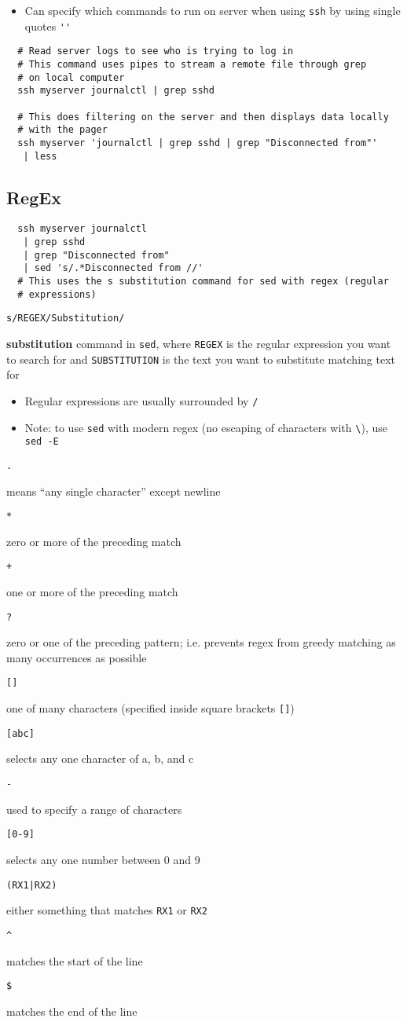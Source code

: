 \documentclass[letterpaper,12pt]{article}
\newcommand*{\lstitem}[1]{
  \setbox0\hbox{\lstinline{#1}}
  \item[\usebox0]
}
\begin{document}
\begin{itemize}
 \item Can specify which commands to run on server when using \lstinline{ssh} by using single quotes \lstinline{''}
\end{itemize}

\begin{lstlisting}
  # Read server logs to see who is trying to log in
  # This command uses pipes to stream a remote file through grep
  # on local computer
  ssh myserver journalctl | grep sshd

  # This does filtering on the server and then displays data locally
  # with the pager
  ssh myserver 'journalctl | grep sshd | grep "Disconnected from"'
   | less
\end{lstlisting}

\subsection{RegEx}

\begin{lstlisting}
  ssh myserver journalctl
   | grep sshd
   | grep "Disconnected from"
   | sed 's/.*Disconnected from //'
  # This uses the s substitution command for sed with regex (regular
  # expressions)
\end{lstlisting}

\begin{description}
 \lstitem{s/REGEX/Substitution/} \textbf{substitution} command in \lstinline{sed}, where \lstinline{REGEX} is the regular expression you want to search for and \lstinline{SUBSTITUTION} is the text you want to substitute matching text for
\end{description}

\begin{itemize}
 \item Regular expressions are usually surrounded by \lstinline{/}
 \item Note: to use \lstinline{sed} with modern regex (no escaping of characters with \lstinline{\}), use \lstinline{sed -E}
\end{itemize}

\begin{description}
 \lstitem{.} means “any single character” except newline
 \lstitem{*} zero or more of the preceding match
 \lstitem{+} one or more of the preceding match
 \lstitem{?} zero or one of the preceding pattern; i.e. prevents regex from greedy matching as many occurrences as possible
 \lstitem{[]} one of many characters (specified inside square brackets \lstinline{[]})
 \lstitem{[abc]} selects any one character of a, b, and c
 \lstitem{-} used to specify a range of characters
 \lstitem{[0-9]} selects any one number between 0 and 9
 \lstitem{(RX1|RX2)} either something that matches \lstinline{RX1} or \lstinline{RX2}
 \lstitem{^} matches the start of the line
 \lstitem{$} matches the end of the line
\end{description}
\end{document}
